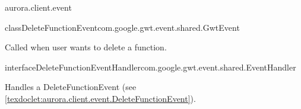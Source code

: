 \begin{texdocpackage}{aurora.client.event}
\begin{texdocclass}{class}{DeleteFunctionEvent}{com.google.gwt.event.shared.GwtEvent}{}
\label{texdoclet:aurora.client.event.DeleteFunctionEvent}
\begin{texdocclassintro}
Called when user wants to delete a function.\end{texdocclassintro}
\begin{texdocclassfields}
\end{texdocclassfields}
\begin{texdocclassconstructors}
\end{texdocclassconstructors}
\begin{texdocclassmethods}
\end{texdocclassmethods}
\end{texdocclass}


\begin{texdocclass}{interface}{DeleteFunctionEventHandler}{}{com.google.gwt.event.shared.EventHandler}
\label{texdoclet:aurora.client.event.DeleteFunctionEventHandler}
\begin{texdocclassintro}
Handles a DeleteFunctionEvent (see \ref{texdoclet:aurora.client.event.DeleteFunctionEvent}).\end{texdocclassintro}
\begin{texdocclassmethods}
\end{texdocclassmethods}
\end{texdocclass}



\end{texdocpackage}
